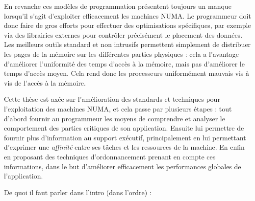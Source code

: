 En revanche ces modèles de programmation présentent toujours un manque lorsqu'il s'agit d'exploiter efficacement les machines NUMA.
Le programmeur doit donc faire de gros efforts pour effectuer des optimisations spécifiques, par exemple via des librairies externes pour contrôler précisément le placement des données.
Les meilleurs outils standard et non intrusifs permettent simplement de distribuer les pages de la mémoire sur les différentes parties physiques : cela a l'avantage d'améliorer l'uniformité des temps d'accès à la mémoire, mais pas d'améliorer le temps d'accès moyen.
Cela rend donc les processeurs uniformément mauvais vis à vis de l'accès à la mémoire.

Cette thèse est axée sur l'amélioration des standards et techniques pour l'exploitation des machines NUMA, et cela passe par plusieurs étapes : tout d'abord fournir au programmeur les moyens de comprendre et analyser le comportement des parties critiques de son application.
Ensuite lui permettre de fournir plus d'information au support exécutif, principalement en lui permettant d'exprimer une \emph{affinité} entre ses tâches et les ressources de la machine.
En enfin en proposant des techniques d'ordonnancement prenant en compte ces informations, dans le but d'améliorer efficacement les performances globales de l'application.



De quoi il faut parler dans l'intro (dans l'ordre) :


